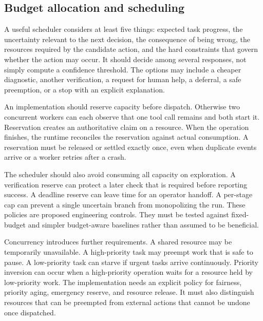 
\subsection{Budget allocation and scheduling}
\label{sec:ch16-budget-scheduling}

A useful scheduler considers at least five things: expected task progress, the uncertainty relevant to the next decision, the consequence of being wrong, the resources required by the candidate action, and the hard constraints that govern whether the action may occur. It should decide among several responses, not simply compute a confidence threshold. The options may include a cheaper diagnostic, another verification, a request for human help, a deferral, a safe preemption, or a stop with an explicit explanation.

An implementation should reserve capacity before dispatch. Otherwise two concurrent workers can each observe that one tool call remains and both start it. Reservation creates an authoritative claim on a resource. When the operation finishes, the runtime reconciles the reservation against actual consumption. A reservation must be released or settled exactly once, even when duplicate events arrive or a worker retries after a crash.

The scheduler should also avoid consuming all capacity on exploration. A verification reserve can protect a later check that is required before reporting success. A deadline reserve can leave time for an operator handoff. A per-stage cap can prevent a single uncertain branch from monopolizing the run. These policies are proposed engineering controls. They must be tested against fixed-budget and simpler budget-aware baselines rather than assumed to be beneficial.

Concurrency introduces further requirements. A shared resource may be temporarily unavailable. A high-priority task may preempt work that is safe to pause. A low-priority task can starve if urgent tasks arrive continuously. Priority inversion can occur when a high-priority operation waits for a resource held by low-priority work. The implementation needs an explicit policy for fairness, priority aging, emergency reserve, and resource release. It must also distinguish resources that can be preempted from external actions that cannot be undone once dispatched.

